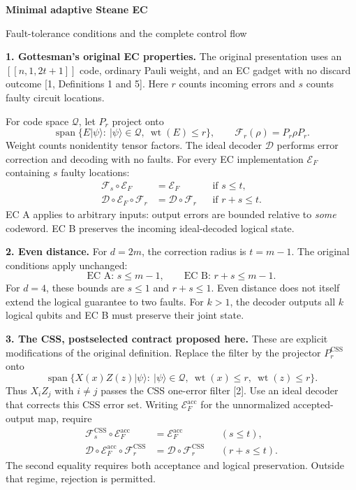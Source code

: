 \documentclass[11pt,a4paper]{article}
\begin{document}
{\LARGE\bfseries Minimal adaptive Steane EC}\par
{\large Fault-tolerance conditions and the complete control flow}

\textbf{1. Gottesman's original EC properties.}
The original presentation uses an $[[n,1,2t+1]]$ code, ordinary Pauli weight,
and an EC gadget with no discard outcome [1, Definitions 1 and 5].
Here $r$ counts incoming errors and $s$ counts faulty circuit locations.

For code space $\mathcal Q$, let $P_r$ project onto
\[
 \operatorname{span}\{E|\psi\rangle:\ |\psi\rangle\in\mathcal Q,
                    \ \operatorname{wt}(E)\leq r\},
 \qquad \mathcal F_r(\rho)=P_r\rho P_r.
\]
Weight counts nonidentity tensor factors. The ideal decoder $\mathcal D$
performs error correction and decoding with no faults. For every EC
implementation $\mathcal E_F$ containing $s$ faulty locations:
\begin{align}
 \mathcal F_s\circ\mathcal E_F&=\mathcal E_F
       &&\text{if }s\leq t, \tag{EC A}\label{eq:eca}\\
 \mathcal D\circ\mathcal E_F\circ\mathcal F_r
       &=\mathcal D\circ\mathcal F_r
       &&\text{if }r+s\leq t. \tag{EC B}\label{eq:ecb}
\end{align}
EC A applies to arbitrary inputs: output errors are bounded relative to
\emph{some} codeword. EC B preserves the incoming ideal-decoded logical state.

\textbf{2. Even distance.}
For $d=2m$, the correction radius is $t=m-1$.
The original conditions apply unchanged:
\[
 \text{EC A: }s\leq m-1,
 \qquad
 \text{EC B: }r+s\leq m-1.
\]
For $d=4$, these bounds are $s\leq1$ and $r+s\leq1$.
Even distance does not itself extend the logical guarantee to two faults.
For $k>1$, the decoder outputs all $k$ logical qubits and EC B must preserve
their joint state.

\textbf{3. The CSS, postselected contract proposed here.}
These are explicit modifications of the original definition.
Replace the filter by the projector $P_r^{\mathrm{CSS}}$ onto
\[
 \operatorname{span}\{X(x)Z(z)|\psi\rangle:\ |\psi\rangle\in\mathcal Q,
         \ \operatorname{wt}(x)\leq r,\ \operatorname{wt}(z)\leq r\}.
\]
Thus $X_iZ_j$ with $i\ne j$ passes the CSS one-error filter [2].
Use an ideal decoder that corrects this CSS error set.
Writing $\mathcal E_F^{\mathrm{acc}}$ for the unnormalized accepted-output map,
require
\begin{align*}
 \mathcal F_s^{\mathrm{CSS}}\circ\mathcal E_F^{\mathrm{acc}}
     &=\mathcal E_F^{\mathrm{acc}} &&(s\leq t),\\
 \mathcal D\circ\mathcal E_F^{\mathrm{acc}}\circ\mathcal F_r^{\mathrm{CSS}}
     &=\mathcal D\circ\mathcal F_r^{\mathrm{CSS}} &&(r+s\leq t).
\end{align*}
The second equality requires both acceptance and logical preservation.
Outside that regime, rejection is permitted.
\end{document}

